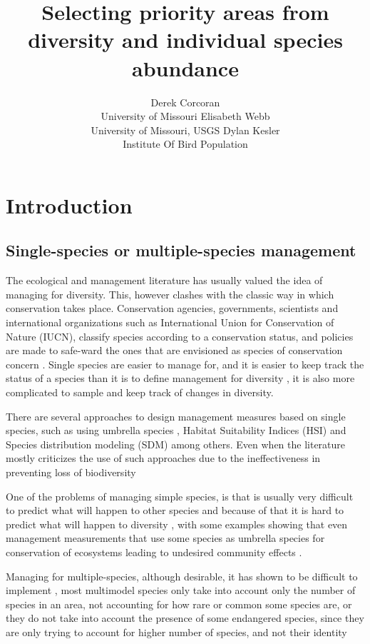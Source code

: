 \documentclass[article]{jss}
\author{
Derek Corcoran\\University of Missouri \And Elisabeth Webb\\University of Missouri, USGS \And Dylan Kesler\\Institute Of Bird Population
}
\title{Selecting priority areas from diversity and individual species abundance
\pkg{DiversityOccupancy}}
\begin{document}
\section{Introduction}\label{introduction}

\subsection{Single-species or multiple-species
management}\label{single-species-or-multiple-species-management}

The ecological and management literature has usually valued the idea of
managing for diversity. This, however clashes with the classic way in
which conservation takes place. Conservation agencies, governments,
scientists and international organizations such as International Union
for Conservation of Nature (IUCN), classify species according to a
conservation status, and policies are made to safe-ward the ones that
are envisioned as species of conservation concern
\citep{keller2004red, rodrigues2006value}. Single species are easier to
manage for, and it is easier to keep track the status of a species than
it is to define management for diversity
\citep{simberloff1998flagships}, it is also more complicated to sample
and keep track of changes in diversity.

There are several approaches to design management measures based on
single species, such as using umbrella species
\citep{crosby2015looking, bichet2016maintaining}, Habitat Suitability
Indices (HSI)
\citep{reza2013integrating, soniat2013predicting, zohmann2013modelling}
and Species distribution modeling (SDM)
\citep{peterson2011ecological, guisan2013predicting} among others. Even
when the literature mostly criticizes the use of such approaches due to
the ineffectiveness in preventing loss of biodiversity
\citep{roberge2004usefulness, branton2011assessing}

One of the problems of managing simple species, is that is usually very
difficult to predict what will happen to other species and because of
that it is hard to predict what will happen to diversity
\citep{pulliam2000relationship}, with some examples showing that even
management measurements that use some species as umbrella species for
conservation of ecosystems leading to undesired community effects
\citep{white2013conservation}.

Managing for multiple-species, although desirable, it has shown to be
difficult to implement
\citep{mollmann2014implementing, lmgren2015baltic}, most multimodel
species only take into account only the number of species in an area,
not accounting for how rare or common some species are, or they do not
take into account the presence of some endangered species, since they
are only trying to account for higher number of species, and not their
identity
\citep{taft2002waterbird, tori2002wetland, plaganyi2014multispecies}
\end{document}
